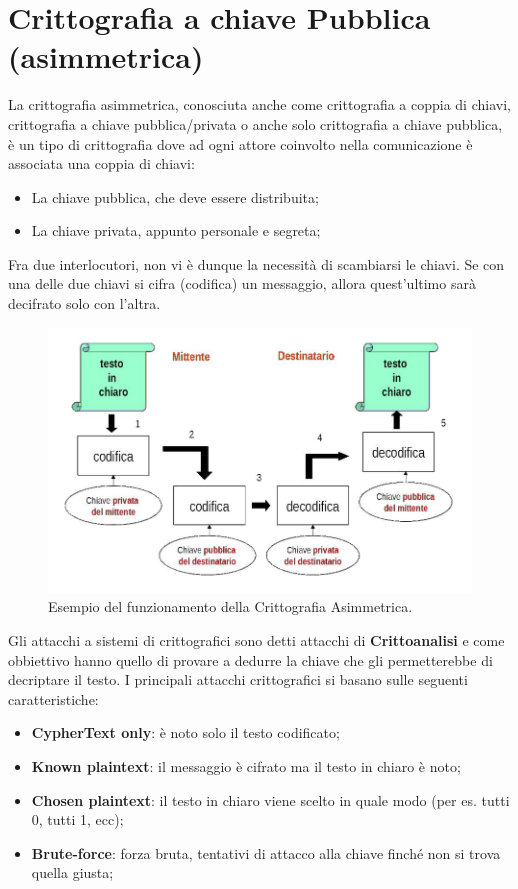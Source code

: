 \section{Crittografia a chiave Pubblica (asimmetrica)}

La crittografia asimmetrica, conosciuta anche come crittografia a coppia di chiavi,
crittografia a
chiave pubblica/privata o anche solo crittografia a chiave pubblica, è un tipo
di crittografia dove ad
ogni attore coinvolto nella comunicazione è associata una coppia di chiavi:

\begin{itemize}
    \item La chiave pubblica, che deve essere distribuita;
    \item La chiave privata, appunto personale e segreta;
\end{itemize}

Fra due interlocutori, non vi è dunque la necessità di scambiarsi le chiavi.
Se con una delle due
chiavi si cifra (codifica) un messaggio, allora quest'ultimo sarà decifrato solo
con l'altra.

\begin{figure}[H]
    \centering
    \includegraphics[width=\textwidth, keepaspectratio]{capitoli/crittografia/imgs/pubblica.png}
    \caption{Esempio del funzionamento della Crittografia Asimmetrica.}
\end{figure}

Gli attacchi a sistemi di crittografici sono detti attacchi
di \textbf{Crittoanalisi} e
come obbiettivo hanno quello di provare a dedurre la chiave che gli
permetterebbe di decriptare il testo.
I principali attacchi crittografici si basano sulle seguenti caratteristiche:

\begin{itemize}
    \item \textbf{CypherText only}: è noto solo il testo codificato;
    \item \textbf{Known plaintext}: il messaggio è cifrato ma il testo in chiaro è noto;
    \item \textbf{Chosen plaintext}: il testo in chiaro viene scelto in quale modo (per es. tutti 0, tutti 1, ecc);
    \item \textbf{Brute-force}: forza bruta, tentativi di attacco alla chiave finché non si trova quella giusta;
\end{itemize}

